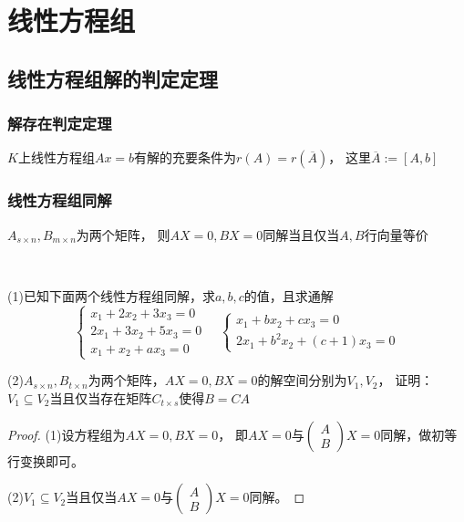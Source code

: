 
\chapter{线性方程组}


\section{线性方程组解的判定定理}

\subsection{解存在判定定理}

\begin{theorem}[解存在充要条件]
  $K$上线性方程组$Ax = b$有解的充要条件为$r(A) = r(\overline{A})$，
  这里$\overline{A} := [A,b]$
\end{theorem}


\subsection{线性方程组同解}

\begin{theorem}[同解定理]
  $A_{s \times n}, B_{m \times n}$为两个矩阵，
  则$AX = 0, BX = 0$同解当且仅当$A,B$行向量等价
\end{theorem}

~

\begin{exercise}[具体应用]
  (1)已知下面两个线性方程组同解，求$a,b,c$的值，且求通解
  \begin{equation*}
    \begin{cases}
      x_1 + 2x_2 + 3x_3 = 0\\
      2x_1 + 3x_2 + 5x_3=0\\
      x_1 + x_2 + ax_3 = 0
    \end{cases}
    \quad
    \begin{cases}
      x_1 + bx_2 + cx_3 = 0\\
      2x_1 + b^2x_2 + (c+1)x_3 = 0
    \end{cases}
  \end{equation*}

  (2)$A_{s \times n}, B_{t \times n}$为两个矩阵，$AX = 0, BX=0$的解空间分别为$V_1,V_2$，
  证明：$V_1 \subseteq V_2$当且仅当存在矩阵$C_{t \times s}$使得$B = CA$
\end{exercise}

\begin{proof}
  (1)设方程组为$AX = 0, BX = 0$，
  即$AX = 0$与$\left(
    \begin{array}{c}
      A\\
      B
    \end{array}
  \right)X = 0$同解，做初等行变换即可。

  (2)$V_1 \subseteq V_2$当且仅当$AX=0$与$\left(
    \begin{array}{c}
      A\\
      B
    \end{array}
  \right)X = 0$同解。
\end{proof}


